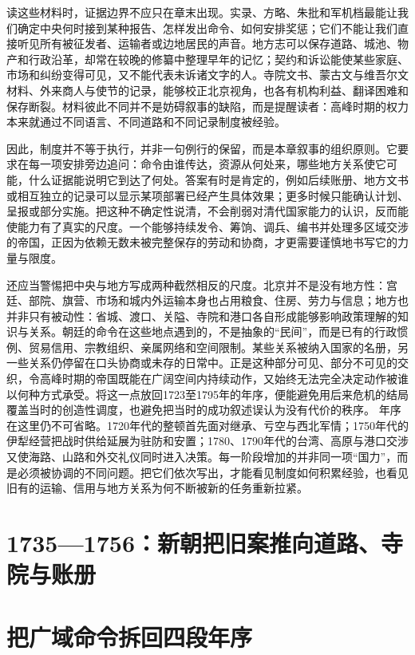 读这些材料时，证据边界不应只在章末出现。实录、方略、朱批和军机档最能让我们确定中央何时接到某种报告、怎样发出命令、如何安排奖惩；它们不能让我们直接听见所有被征发者、运输者或边地居民的声音。地方志可以保存道路、城池、物产和行政沿革，却常在较晚的修纂中整理早年的记忆；契约和诉讼能使某些家庭、市场和纠纷变得可见，又不能代表未诉诸文字的人。寺院文书、蒙古文与维吾尔文材料、外来商人与使节的记录，能够校正北京视角，也各有机构利益、翻译困难和保存断裂。材料彼此不同并不是妨碍叙事的缺陷，而是提醒读者：高峰时期的权力本来就通过不同语言、不同道路和不同记录制度被经验。

因此，制度并不等于执行，并非一句例行的保留，而是本章叙事的组织原则。它要求在每一项安排旁边追问：命令由谁传达，资源从何处来，哪些地方关系使它可能，什么证据能说明它到达了何处。答案有时是肯定的，例如后续账册、地方文书或相互独立的记录可以显示某项部署已经产生具体效果；更多时候只能确认计划、呈报或部分实施。把这种不确定性说清，不会削弱对清代国家能力的认识，反而能使能力有了真实的尺度。一个能够持续发令、筹饷、调兵、编书并处理多区域交涉的帝国，正因为依赖无数未被完整保存的劳动和协商，才更需要谨慎地书写它的力量与限度。

还应当警惕把中央与地方写成两种截然相反的尺度。北京并不是没有地方性：宫廷、部院、旗营、市场和城内外运输本身也占用粮食、住房、劳力与信息；地方也并非只有被动性：省城、渡口、关隘、寺院和港口各自形成能够影响政策理解的知识与关系。朝廷的命令在这些地点遇到的，不是抽象的“民间”，而是已有的行政惯例、贸易信用、宗教组织、亲属网络和空间限制。某些关系被纳入国家的名册，另一些关系仍停留在口头协商或未存的日常中。正是这种部分可见、部分不可见的交织，令高峰时期的帝国既能在广阔空间内持续动作，又始终无法完全决定动作被谁以何种方式承受。将这一点放回1723至1795年的年序，便能避免用后来危机的结局覆盖当时的创造性调度，也避免把当时的成功叙述误认为没有代价的秩序。
年序在这里仍不可省略。1720年代的整顿首先面对继承、亏空与西北军情；1750年代的伊犁经营把战时供给延展为驻防和安置；1780、1790年代的台湾、高原与港口交涉又使海路、山路和外交礼仪同时进入决策。每一阶段增加的并非同一项“国力”，而是必须被协调的不同问题。把它们依次写出，才能看见制度如何积累经验，也看见旧有的运输、信用与地方关系为何不断被新的任务重新拉紧。
\section{1735—1756：新朝把旧案推向道路、寺院与账册}

\section{把广域命令拆回四段年序}

